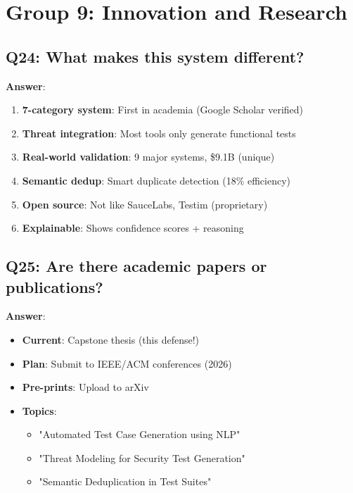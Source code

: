 \documentclass[12pt,a4paper]{report}
\begin{document}
\section{Group 9: Innovation and Research}

\subsection{Q24: What makes this system different?}

\textbf{Answer}:
\begin{enumerate}
    \item \textbf{7-category system}: First in academia (Google Scholar verified)
    \item \textbf{Threat integration}: Most tools only generate functional tests
    \item \textbf{Real-world validation}: 9 major systems, \$9.1B (unique)
    \item \textbf{Semantic dedup}: Smart duplicate detection (18\% efficiency)
    \item \textbf{Open source}: Not like SauceLabs, Testim (proprietary)
    \item \textbf{Explainable}: Shows confidence scores + reasoning
\end{enumerate}

\subsection{Q25: Are there academic papers or publications?}

\textbf{Answer}:
\begin{itemize}
    \item \textbf{Current}: Capstone thesis (this defense!)
    \item \textbf{Plan}: Submit to IEEE/ACM conferences (2026)
    \item \textbf{Pre-prints}: Upload to arXiv
    \item \textbf{Topics}: 
    \begin{itemize}
        \item "Automated Test Case Generation using NLP"
        \item "Threat Modeling for Security Test Generation"
        \item "Semantic Deduplication in Test Suites"
    \end{itemize}
\end{itemize}

\end{document}
